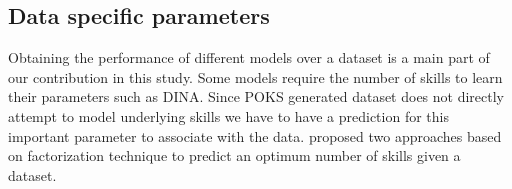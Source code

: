 


\subsection{Data specific parameters}

Obtaining the performance of different models over a dataset is a main part of our contribution in this study. Some models require the number of skills to learn their parameters such as DINA. Since POKS generated dataset does not directly attempt to model underlying skills we have to have a prediction for this important parameter to associate with the data. \citet{Beheshti2012Numbers} proposed two approaches based on factorization technique to predict an optimum number of skills given a dataset. 


